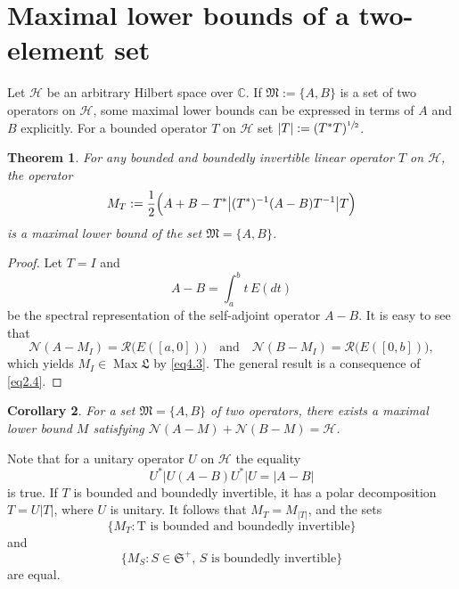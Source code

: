 \documentclass[12pt, a4paper, reqno, twoside]{amsart}
\numberwithin{equation}{section}
\DeclareMathOperator{\Max}{Max}
\newcommand{\frakS}{\mathfrak S}
\newcommand{\frakL}{\mathfrak L}
\newcommand{\frakM}{\mathfrak M}
\newtheorem{theorem}{Theorem}[section]
\newtheorem{corollary}[theorem]{Corollary}
\theoremstyle{definition}
\theoremstyle{remark}
\theoremstyle{mystyle}
\begin{document}
\section{Maximal lower bounds of a two-element set}
\label{sec5}
Let $\mathscr H$ be an arbitrary Hilbert space over $\mathbb C$. If
$\frakM:=\{A,B\}$ is a set of two operators on $\mathscr H$, some
maximal lower bounds can be expressed in terms of $A$ and $B$
explicitly. For a bounded operator $T$ on $\mathscr H$ set $|T|:=(T^{\ast}T)^{\sfrac{1}{2}}$.

\begin{theorem}
\label{thm5.1}  
For any bounded and boundedly invertible linear operator $T$ on
$\mathscr H$, the operator
\begin{equation}
\label{eq5.1}
M_{T}:=\frac{1}{2}\Bigl(A+B
-T^{\ast}\bigl|(T^{\ast})^{-1}(A-B)T^{-1}\bigr| T\Bigr) 
\end{equation}
is a maximal lower bound of the set $\frakM=\{A,B\}$.
\end{theorem}

\begin{proof}
Let $T=I$ and
\[
  A-B = \int_{a}^{b} t\,E(dt)
\]
be the spectral representation of the self-adjoint operator $A-B$. It
is easy to see that
\[
  \mathscr N(A-M_{I})=\mathscr R\bigl(E([a,0])\bigr)
  \quad\text{and}\quad
  \mathscr N(B-M_{I})=\mathscr R\bigl(E([0,b])\bigr),
\]
which yields $M_{I}\in\Max\frakL$ by \eqref{eq4.3}. The general result
is a consequence of \eqref{eq2.4}.
\end{proof}

\begin{corollary}
\label{cor5.2}
For a set $\frakM=\{A,B\}$ of two operators, there exists a maximal
lower bound $M$ satisfying
$\mathscr N(A-M)+\mathscr N(B-M)=\mathscr H$.
\end{corollary}

Note that for a unitary operator $U$ on $\mathscr H$ the equality
\[
  U^{\ast}\bigl|U(A-B)U^{\ast}\bigr|U = |A-B|
\]
is true. If $T$ is bounded and boundedly invertible, it has a polar
decomposition $T=U|T|$, where $U$ is unitary. It follows that
$M_{T}=M_{|T|}$, and the sets
\[
\bigl\{M_{T}: \text{T is bounded and boundedly invertible}\}
\]
and
\begin{equation}
\label{eq5.2}
\bigl\{ M_{S} : \text{$S\in\frakS^{+}$, $S$ is boundedly invertible}\bigr\} 
\end{equation}
are equal.
\end{document}
